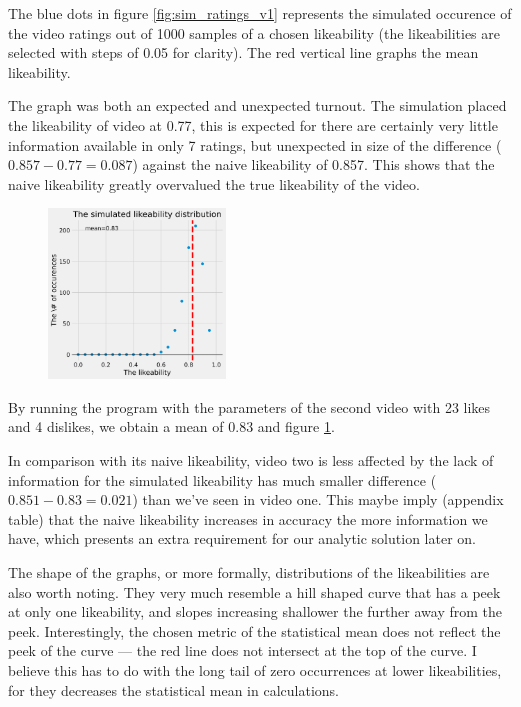 \documentclass[a4paper,11pt]{article}
\begin{document}
The blue dots in figure \ref{fig:sim_ratings_v1} represents the simulated occurence of the video ratings out of 1000 samples of a chosen likeability (the likeabilities are selected with steps of 0.05 for clarity). The red vertical line graphs the mean likeability.

The graph was both an expected and unexpected turnout. The simulation placed the likeability of video at 0.77, this is expected for there are certainly very little information available in only 7 ratings, but unexpected in size of the difference ($0.857-0.77=0.087$) against the naive likeability of 0.857. This shows that the naive likeability greatly overvalued the true likeability of the video.

\begin{figure}
    \includegraphics[width=0.42\textwidth,right]{assets/sim_ratings_v2.png}
    \caption{}
    \label{fig:sim_ratings_v2}
\end{figure}


By running the program with the parameters of the second video with 23 likes and 4 dislikes,
we obtain a mean of 0.83 and figure \ref{fig:sim_ratings_v2}.

In comparison with its naive likeability, video two is less affected by the lack of information for the simulated likeability has much smaller difference ($0.851-0.83=0.021$) than we've seen in video one. This maybe imply (appendix table) that the naive likeability increases in accuracy the more information we have, which presents an extra requirement for our analytic solution later on.

The shape of the graphs, or more formally, distributions of the likeabilities are also worth noting. They very much resemble a hill shaped curve that has a peek at only one likeability, and slopes increasing shallower the further away from the peek. Interestingly, the chosen metric of the statistical mean does not reflect the peek of the curve --- the red line does not intersect at the top of the curve. I believe this has to do with the long tail of zero occurrences at lower likeabilities, for they decreases the statistical mean in calculations.
\end{document}
